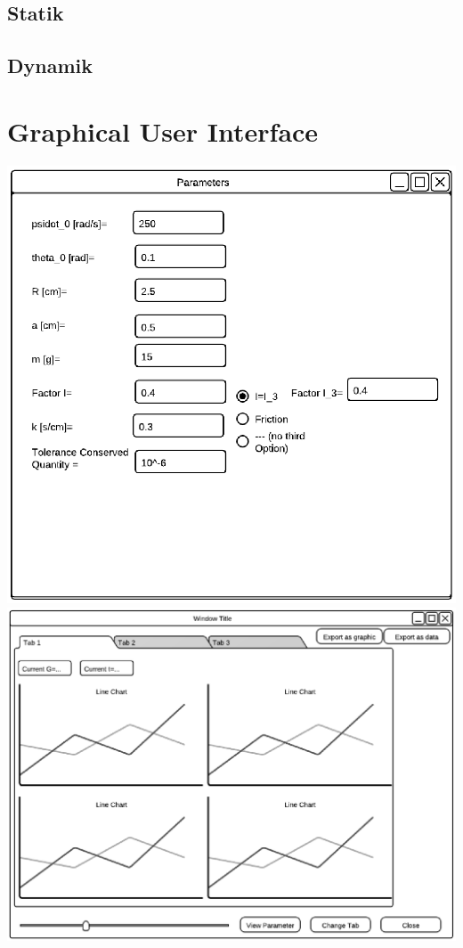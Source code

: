 
\subsection{Statik}
\subsection{Dynamik}
\section{Graphical User Interface}
\label{sec:3.3}
\includegraphics[width=6in,keepaspectratio=true]{figures/GUIParameterInputForm.eps}
\includegraphics[width=6in,keepaspectratio=true]{figures/GUIDisplayForm.eps}
